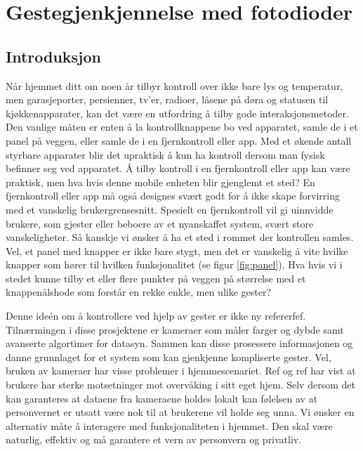 \section{Gestegjenkjennelse med fotodioder}
\subsection{Introduksjon}
Når hjemmet ditt om noen år tilbyr kontroll over ikke bare lys og temperatur, men garasjeporter, persienner, tv'er, radioer, låsene på døra og statusen til kjøkkenapparater, kan det være en utfordring å tilby gode interaksjonsmetoder. Den vanlige måten er enten å la kontrollknappene bo ved apparatet, samle de i et panel på veggen, eller samle de i en fjernkontroll eller app. Med et økende antall styrbare apparater blir det upraktisk å kun ha kontroll dersom man fysisk befinner seg ved apparatet. Å tilby kontroll i en fjernkontroll eller app kan være praktisk, men hva hvis denne mobile enheten blir gjenglemt et sted? En fjernkontroll eller app må også designes svært godt for å ikke skape forvirring med et vanskelig brukergrensesnitt. Spesielt en fjernkontroll vil gi uinnvidde brukere, som gjester eller beboere av et nyanskaffet system, svært store vanskeligheter. Så kanskje vi ønsker å ha et sted i rommet der kontrollen samles. Vel, et panel med knapper er ikke bare stygt, men det er vanskelig å vite hvilke knapper som hører til hvilken funksjonalitet (se figur \ref{fig:panel}). Hva hvis vi i stedet kunne tilby et eller flere punkter på veggen på størrelse med et knappenålshode som forstår en rekke enkle, men ulike gester? 
 
Denne ideén om å kontrollere ved hjelp av gester er ikke ny {\color{red} refererfef}. Tilnærmingen i disse prosjektene er kameraer som måler farger og dybde samt avanserte algortimer for datasyn. Sammen kan disse prosessere informasjonen og danne grunnlaget for et system som kan gjenkjenne kompliserte gester. Vel, bruken av kameraer har visse problemer i hjemmescenariet. {\color{red} Ref og ref} har vist at brukere har sterke motsetninger mot overvåking i sitt eget hjem. Selv dersom det kan garanteres at dataene fra kameraene holdes lokalt kan følelsen av at personvernet er utsatt være nok til at brukerene vil holde seg unna. Vi ønsker en alternativ måte å interagere med funksjonaliteten i hjemmet. Den skal være naturlig, effektiv og må garantere et vern av personvern og privatliv.

